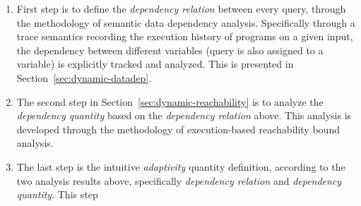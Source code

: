 \begin{enumerate}
 \item First step is to define the \emph{dependency relation} between every query, 
 through the methodology of semantic data dependency analysis.
 Specifically through a trace semantics recording the execution history of programs on a given input,
 the dependency between different variables (query is also assigned to a variable) is explicitly tracked and 
 analyzed. This is presented in Section~\ref{sec:dynamic-datadep}.
 \item The second step in Section~\ref{sec:dynamic-reachability} is to analyze the \emph{dependency quantity} 
 based on the \emph{dependency relation} above.
 This analysis is developed through the methodology of execution-based reachability bound analysis.
 \item The last step is the intuitive \emph{adaptivity} quantity definition, 
 according to the two analysis results above, specifically \emph{dependency relation} and \emph{dependency quantity}.
 This step 

\end{enumerate}
